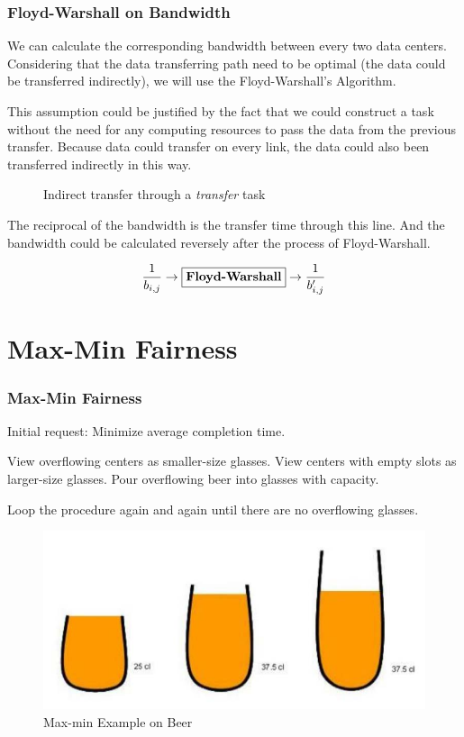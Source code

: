 \begin{frame}[allowframebreaks]
\frametitle{Floyd-Warshall on Bandwidth}
    We can calculate the corresponding bandwidth between every two data centers. Considering that the data transferring path need to be optimal (the data could be transferred indirectly), we will use the Floyd-Warshall's Algorithm. 
    
    This assumption could be justified by the fact that we could construct a  task without the need for any computing resources to pass the data from the previous transfer. Because data could transfer on every link, the data could also been transferred indirectly in this way.
    
    \begin{figure}
        \centering
        
        \caption{Indirect transfer through a \emph{transfer} task}
        \label{fig:my_label}
    \end{figure}
    
    The reciprocal of the bandwidth is the transfer time through this line. And the bandwidth could be calculated reversely after the process of Floyd-Warshall.
    
    \begin{equation*}
        \frac{1}{b_{i,j}}\rightarrow \textbf{\fbox{Floyd-Warshall}} \rightarrow \frac{1}{b^\prime_{i,j}}
    \end{equation*}

\end{frame}
\section{Max-Min Fairness}

\begin{frame}
\frametitle{Max-Min Fairness}
    Initial request: Minimize average completion time.
    
    View overflowing centers as smaller-size glasses. View centers with empty slots as larger-size glasses. Pour overflowing beer into glasses with capacity.
    
    Loop the procedure again and again until there are no overflowing glasses.
    
    \begin{figure}
        \centering
        \includegraphics{img/beer.jpg}
        \caption{Max-min Example on Beer}
    \end{figure}
\end{frame}

